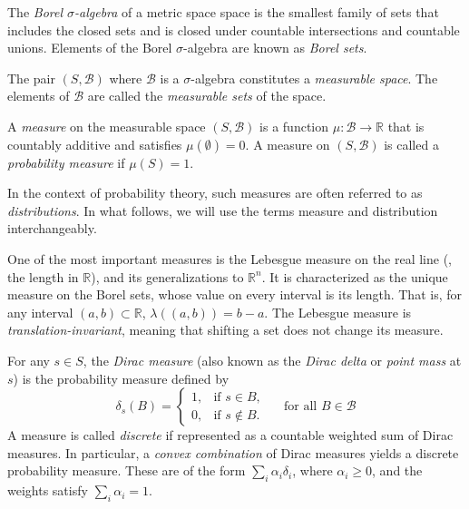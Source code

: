 \begin{definition}
  The \emph{Borel $\sigma$-algebra} of a metric space space is the smallest family
 of sets that includes  the closed sets and is closed under countable intersections and countable unions. Elements of the Borel
 $\sigma$-algebra are known as \emph{Borel sets}. 
\end{definition}

\begin{definition} 
  The pair $(S, \mathcal{B})$ where $\mathcal{B}$ is a $\sigma$-algebra constitutes a \emph{measurable space}. The elements of $\mathcal{B}$ are called  the \emph{measurable sets} of the space. 
\end{definition}



\begin{definition} 
  A  \emph{measure} on the measurable space $(S,\mathcal{B})$ is a function $\mu: \mathcal{B} \to  \mathbb{R} $ that is countably additive and satisfies $\mu(\emptyset)=0$. A measure  on $(S,\mathcal{B})$ is called a \emph{probability measure} if $\mu(S) = 1$.
\end{definition}

 In the context of probability theory, such measures are often referred to as \emph{distributions}. In what follows, we will use the terms measure and distribution interchangeably.

 

 One of the most important measures is the Lebesgue measure on the real line (\ie, the length in $\mathbb{R}$), and its generalizations to $\mathbb{R}^n$.  It is characterized as the unique measure on the Borel sets, whose value on every interval is its length. That is, for any interval $(a, b) \subset \mathbb{R}$,
$
\lambda((a, b)) = b - a.$ The Lebesgue measure is \emph{translation-invariant}, meaning that shifting a set does not change its measure.

For any $ s \in S $, the \emph{Dirac measure} (also known as the \emph{Dirac delta} or \emph{point mass} at \( s \)) is the probability measure defined by
$$
\delta_s(B) =
\begin{cases}
1, & \text{if } s \in B, \\
0, & \text{if } s \notin B.
\end{cases} \quad \text{ for all } B \in \mathcal{B}
$$
A measure is called \emph{discrete} if represented as a countable weighted sum of Dirac measures. In particular, a \emph{convex combination} of Dirac measures yields a discrete probability measure. These are of the form $\sum_{i} \alpha_i \delta_i$,
where $ \alpha_i \geq 0 $, and the weights satisfy $ \sum_{i} \alpha_i = 1 $.


